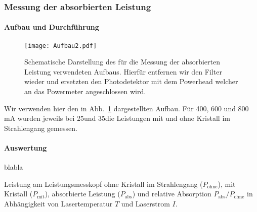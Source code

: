 \subsubsection{Messung der absorbierten Leistung}

\paragraph{Aufbau und Durchführung}

\begin{figure}[H]
\begin{center}
  \texttt{[image: Aufbau2.pdf]}
  \caption{Schematische Darstellung des für die Messung der absorbierten Leistung verwendeten Aufbaus. Hierfür entfernen wir den Filter wieder und ersetzten den Photodetektor mit dem Powerhead welcher an das Powermeter angeschlossen wird.}
  \label{img:aufbau2}
\end{center}
\end{figure}

Wir verwenden hier den in Abb.~\ref{img:aufbau2} dargestellten Aufbau. Für 400, 600 und 800\,mA wurden jeweils bei 25\grad und 35\grad die Leistungen mit und ohne Kristall im Strahlengang gemessen.



\paragraph{Auswertung}
blabla
 
\begin{table}[htb]
\caption{Leistung am Leistungsmesskopf ohne Kristall im Strahlengang ($P_\text{ohne}$),
mit Kristall ($P_\text{mit}$), absorbierte Leistung ($P_\text{abs}$) und relative Absorption
$P_\text{abs}/P_\text{ohne}$ in Abhängigkeit von Lasertemperatur $T$ und Laserstrom $I$.}

\label{tab:Absorption}
\end{table}
